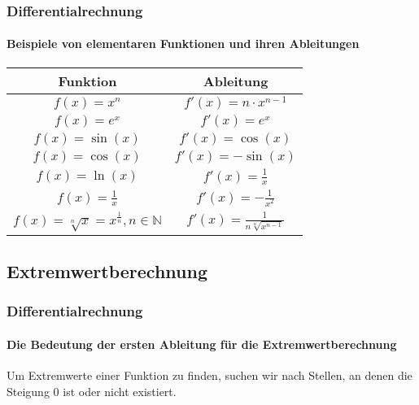 \documentclass{beamer}
\begin{document}
\begin{frame}
  \frametitle{Differentialrechnung}
  \framesubtitle{Beispiele von elementaren Funktionen und ihren Ableitungen}

  \begin{center}
    \begin{tabular}{c|c}
      
      \textbf{Funktion} & \textbf{Ableitung} \\
      \hline
      $f(x) = x^n$ & $f'(x) = n \cdot x^{n-1}$ \\[.7ex]
      
      $f(x) = e^x$ & $f'(x) = e^x$ \\[.7ex]
      
      $f(x) = \sin(x)$ & $f'(x) = \cos(x)$ \\[.7ex]
  
      $f(x) = \cos(x)$ & $f'(x) = -\sin(x)$ \\[.7ex]
  
      $f(x) = \ln(x)$ & $f'(x) = \frac{1}{x}$ \\[.7ex]
  
      $f(x) = \frac{1}{x}$ & $f'(x) = -\frac{1}{x^2}$ \\[.7ex]
  
      $f(x) = \sqrt[n]{x}= x^{\frac{1}{n}}, n \in \mathbb{N}$ & $f'(x)=\frac{1}{n \sqrt[n]{x^{n-1}}}$
  
    \end{tabular}
  \end{center}

  
\end{frame}

\subsection{Extremwertberechnung}
\begin{frame}
  \frametitle{Differentialrechnung}
  \framesubtitle{Die Bedeutung der ersten Ableitung für die Extremwertberechnung}

Um Extremwerte einer Funktion zu finden, suchen wir nach Stellen, an denen die Steigung $0$ ist oder nicht existiert.
 
  
  
\end{frame}
\end{document}
